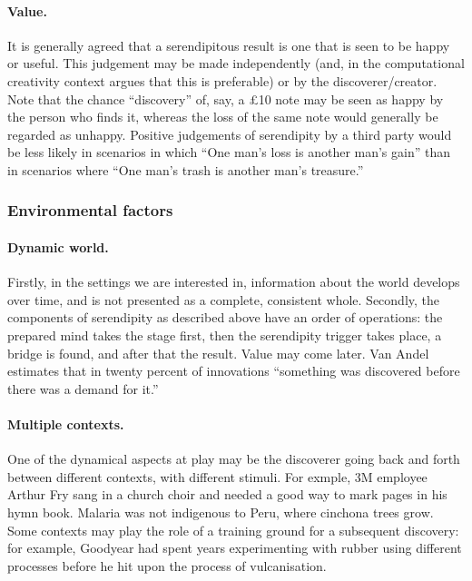 \paragraph{Value.}

It is generally agreed that a serendipitous result is one that is seen
to be happy or useful.
%
This judgement may be made independently (and, in the computational
creativity context \cite{jordanous:12} argues that this is
preferable) or by the discoverer/creator.  Note that the chance
``discovery'' of, say, a \pounds 10 note may be seen as happy by the
person who finds it, whereas the loss of the same note would generally
be regarded as unhappy.  Positive judgements of serendipity by a third
party would be less likely in scenarios in which ``One man's loss is
another man's gain'' than in scenarios where ``One man's trash is
another man's treasure.''

\newpage
\subsubsection*{Environmental factors}

\paragraph{Dynamic world.}

Firstly, in the settings we are interested in, information about the
world develops over time, and is not presented as a complete,
consistent whole.
%
Secondly, the components of serendipity as described above have an
order of operations: the prepared mind takes the stage first, then the
serendipity trigger takes place, a bridge is found, and after that the
result.  Value may come later.  Van Andel
\citeyear[p. 643]{van1994anatomy} estimates that in twenty percent of
innovations ``something was discovered before there was a demand for
it.''

\paragraph{Multiple contexts.}

One of the dynamical aspects at play may be the discoverer going back
and forth between different contexts, with different stimuli.
%
For exmple, 3M employee Arthur Fry sang in a church choir and needed a
good way to mark pages in his hymn book.  Malaria was not indigenous
to Peru, where cinchona trees grow.  Some contexts may play the role
of a training ground for a subsequent discovery: for example, Goodyear
had spent years experimenting with rubber using different processes
before he hit upon the process of vulcanisation.

